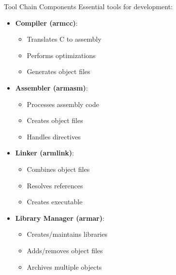 \begin{concept}{Tool Chain Components}
Essential tools for development:

\begin{minipage}[t]{0.5\textwidth}
  \begin{itemize}
    \item \textbf{Compiler (armcc)}:
      \begin{itemize}
        \item Translates C to assembly
        \item Performs optimizations
        \item Generates object files
      \end{itemize}
    \item \textbf{Assembler (armasm)}:
      \begin{itemize}
        \item Processes assembly code
        \item Creates object files
        \item Handles directives
      \end{itemize}
  \end{itemize}
\end{minipage}
\begin{minipage}[t]{0.5\textwidth}
  \begin{itemize}
    \item \textbf{Linker (armlink)}:
      \begin{itemize}
        \item Combines object files
        \item Resolves references
        \item Creates executable
      \end{itemize}
    \item \textbf{Library Manager (armar)}:
      \begin{itemize}
        \item Creates/maintains libraries
        \item Adds/removes object files
        \item Archives multiple objects
      \end{itemize}
  \end{itemize}
\end{minipage}
\end{concept}

